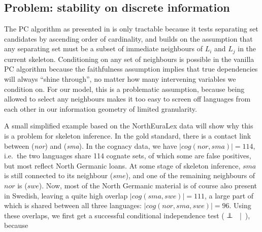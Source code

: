 \subsection{Problem: stability on discrete information}
The PC algorithm as presented in  is only tractable because it tests separating set candidates by ascending order of cardinality, and builds on the assumption that any separating set must be a subset of immediate neighbours of $L_i$ and $L_j$ in the current skeleton. Conditioning on any set of neighbours is possible in the vanilla PC algorithm because the faithfulness assumption implies that true dependencies will always ``shine through'', no matter how many intervening variables we condition on. For our model, this is a problematic assumption, because being allowed to select any neighbours makes it too easy to screen off languages from each other in our information geometry of limited granularity.

A small simplified example based on the NorthEuraLex data will show why this is a problem for skeleton inference. In the gold standard, there is a contact link between  (\textit{nor}) and  (\textit{sma}). In the cognacy data, we have $|cog(nor,sma)| = 114$, i.e.\ the two languages share 114 cognate sets, of which some are false positives, but most reflect North Germanic loans. At some stage of skeleton inference, $sma$ is still connected to its neighbour  ($sme$), and one of the remaining neighbours of $nor$ is  ($swe$). Now, most of the North Germanic material is of course also present in Swedish, leaving a quite high overlap $|cog(sma,swe)| = 111$, a large part of which is shared between all three languages: $|cog(nor,sma,swe)| = 96$. Using these overlaps, we first get a successful conditional independence test ( $\indep$ \ |\ ), because


